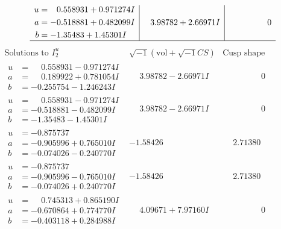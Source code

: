 \documentclass[1p]{elsarticle_modified}
\theoremstyle{definition}
\newcommand{\I}{\sqrt{-1}}
\begin{document}
$$\begin{array}{c|c|c}
\begin{aligned}
u &= \phantom{-}0.558931 + 0.971274 I \\
a &= -0.518881 + 0.482099 I \\
b &= -1.35483 + 1.45301 I\end{aligned}
 & \phantom{-}3.98782 + 2.66971 I & \phantom{-0.000000 } 0\\
 \hline 
 \end{array}$$\newpage$$\begin{array}{c|c|c}  
\text{Solutions to }I^u_{2}& \I (\text{vol} + \sqrt{-1}CS) & \text{Cusp shape}\\
 \hline 
\begin{aligned}
u &= \phantom{-}0.558931 - 0.971274 I \\
a &= \phantom{-}0.189922 + 0.781054 I \\
b &= -0.255754 - 1.246243 I\end{aligned}
 & \phantom{-}3.98782 - 2.66971 I & \phantom{-0.000000 } 0 \\ \hline\begin{aligned}
u &= \phantom{-}0.558931 - 0.971274 I \\
a &= -0.518881 - 0.482099 I \\
b &= -1.35483 - 1.45301 I\end{aligned}
 & \phantom{-}3.98782 - 2.66971 I & \phantom{-0.000000 } 0 \\ \hline\begin{aligned}
u &= -0.875737\phantom{ +0.000000I} \\
a &= -0.905996 + 0.765010 I \\
b &= -0.074026 - 0.240770 I\end{aligned}
 & -1.58426\phantom{ +0.000000I} & \phantom{-}2.71380\phantom{ +0.000000I} \\ \hline\begin{aligned}
u &= -0.875737\phantom{ +0.000000I} \\
a &= -0.905996 - 0.765010 I \\
b &= -0.074026 + 0.240770 I\end{aligned}
 & -1.58426\phantom{ +0.000000I} & \phantom{-}2.71380\phantom{ +0.000000I} \\ \hline\begin{aligned}
u &= \phantom{-}0.745313 + 0.865190 I \\
a &= -0.670864 + 0.774770 I \\
b &= -0.403118 + 0.284988 I\end{aligned}
 & \phantom{-}4.09671 + 7.97160 I & \phantom{-0.000000 } 0 \\ \hline\begin{aligned}

\end{aligned}
\end{array}$$
\end{document}
